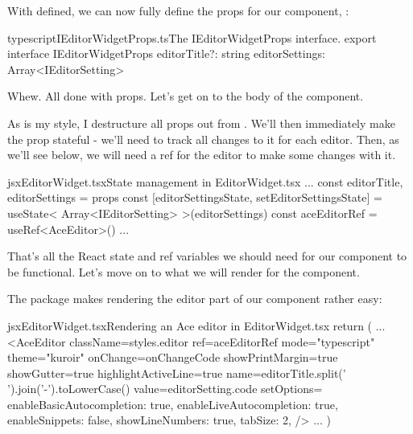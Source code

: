 \documentclass[paper=6in:9in,pagesize=pdftex,headinclude=on,footinclude=on,12pt]{scrbook}
\begin{document}
With  defined, we can now fully define the props for our component, :

\begin{codeInput}{typescript}{IEditorWidgetProps.ts}{The IEditorWidgetProps interface.}
export interface IEditorWidgetProps {
  editorTitle?: string
  editorSettings: Array<IEditorSetting>
}
\end{codeInput}

Whew. All done with props. Let's get on to the body of the component.


As is my style, I destructure all props out from . We'll then immediately make the  prop stateful - we'll need to track all changes to it for each editor. Then, as we'll see below, we will need a ref for the editor to make some changes with it.

\begin{codeInput}{jsx}{EditorWidget.tsx}{State management in EditorWidget.tsx}
...
const { editorTitle, editorSettings } = props
const [editorSettingsState, setEditorSettingsState] = useState<
  Array<IEditorSetting>
>(editorSettings)
const aceEditorRef = useRef<AceEditor>()
...
\end{codeInput}

That's all the React state and ref variables we should need for our component to be functional. Let's move on to what we will render for the component.


The  package makes rendering the editor part of our component rather easy:

\begin{codeInput}{jsx}{EditorWidget.tsx}{Rendering an Ace editor in EditorWidget.tsx}
return (
  ...
  <AceEditor
    className={styles.editor}
    ref={aceEditorRef}
    mode="typescript"
    theme="kuroir"
    onChange={onChangeCode}
    showPrintMargin={true}
    showGutter={true}
    highlightActiveLine={true}
    name={editorTitle.split(' ').join('-').toLowerCase()}
    value={editorSetting.code}
    setOptions={{
      enableBasicAutocompletion: true,
      enableLiveAutocompletion: true,
      enableSnippets: false,
      showLineNumbers: true,
      tabSize: 2,
    }}
  />
  ...
)
\end{codeInput}
\end{document}

